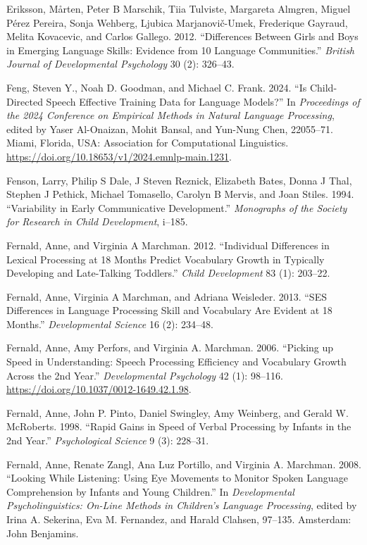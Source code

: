 \documentclass[
  11pt,
]{article}
\newlength{\cslhangindent}
\newenvironment{CSLReferences}[2] %
 {\begin{list}{}{%
  \setlength{\itemindent}{0pt}
  \setlength{\leftmargin}{0pt}
  \setlength{\parsep}{0pt}
  \ifodd #1
   \setlength{\leftmargin}{\cslhangindent}
   \setlength{\itemindent}{-1\cslhangindent}
  \fi
  \setlength{\itemsep}{#2\baselineskip}}}
 {\end{list}}
\begin{document}
\begin{CSLReferences}{1}{0}
Eriksson, Mårten, Peter B Marschik, Tiia Tulviste, Margareta Almgren,
Miguel Pérez Pereira, Sonja Wehberg, Ljubica Marjanovič-Umek, Frederique
Gayraud, Melita Kovacevic, and Carlos Gallego. 2012. {``Differences
Between Girls and Boys in Emerging Language Skills: Evidence from 10
Language Communities.''} \emph{British Journal of Developmental
Psychology} 30 (2): 326--43.

Feng, Steven Y., Noah D. Goodman, and Michael C. Frank. 2024. {``Is
Child-Directed Speech Effective Training Data for Language Models?''} In
\emph{Proceedings of the 2024 Conference on Empirical Methods in Natural
Language Processing}, edited by Yaser Al-Onaizan, Mohit Bansal, and
Yun-Nung Chen, 22055--71. Miami, Florida, USA: Association for
Computational Linguistics.
\url{https://doi.org/10.18653/v1/2024.emnlp-main.1231}.

Fenson, Larry, Philip S Dale, J Steven Reznick, Elizabeth Bates, Donna J
Thal, Stephen J Pethick, Michael Tomasello, Carolyn B Mervis, and Joan
Stiles. 1994. {``Variability in Early Communicative Development.''}
\emph{Monographs of the Society for Research in Child Development},
i--185.

Fernald, Anne, and Virginia A Marchman. 2012. {``Individual Differences
in Lexical Processing at 18 Months Predict Vocabulary Growth in
Typically Developing and Late-Talking Toddlers.''} \emph{Child
Development} 83 (1): 203--22.

Fernald, Anne, Virginia A Marchman, and Adriana Weisleder. 2013. {``SES
Differences in Language Processing Skill and Vocabulary Are Evident at
18 Months.''} \emph{Developmental Science} 16 (2): 234--48.

Fernald, Anne, Amy Perfors, and Virginia A. Marchman. 2006. {``Picking
up Speed in Understanding: Speech Processing Efficiency and Vocabulary
Growth Across the 2nd Year.''} \emph{Developmental Psychology} 42 (1):
98--116. \url{https://doi.org/10.1037/0012-1649.42.1.98}.

Fernald, Anne, John P. Pinto, Daniel Swingley, Amy Weinberg, and Gerald
W. McRoberts. 1998. {``Rapid Gains in Speed of Verbal Processing by
Infants in the 2nd Year.''} \emph{Psychological Science} 9 (3): 228--31.

Fernald, Anne, Renate Zangl, Ana Luz Portillo, and Virginia A. Marchman.
2008. {``Looking While Listening: Using Eye Movements to Monitor Spoken
Language Comprehension by Infants and Young Children.''} In
\emph{Developmental Psycholinguistics: On-Line Methods in Children's
Language Processing}, edited by Irina A. Sekerina, Eva M. Fernandez, and
Harald Clahsen, 97--135. Amsterdam: John Benjamins.


\end{CSLReferences}
\end{document}
